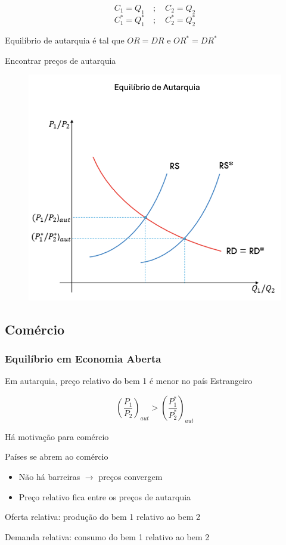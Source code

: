 \documentclass[a4paper,12pt]{article}[abntex2]
\begin{document}
\[
C_1 = Q_1 \quad ; \quad C_2 = Q_2
\]
\[
C_1^* = Q_1^* \quad ; \quad C_2^* = Q_2^*
\]

Equilíbrio de autarquia é tal que \( OR = DR \) e \( OR^* = DR^* \)

Encontrar preços de autarquia

\begin{figure}[H]
    \centering
    \includegraphics[width=0.7\linewidth]{Imagens/a12i10.png}
\end{figure}

\subsection{\textbf{Comércio}}
\subsubsection{\textbf{Equilíbrio em Economia Aberta}}

Em autarquia, preço relativo do bem 1 é menor no país Estrangeiro

\[
\left( \frac{P_1}{P_2} \right)_{aut} > \left( \frac{P_1^*}{P_2^*} \right)_{aut}
\]

Há motivação para comércio

Países se abrem ao comércio
\begin{itemize}
    \item Não há barreiras \( \rightarrow \) preços convergem
    \item Preço relativo fica entre os preços de autarquia
\end{itemize}

Oferta relativa: produção do bem 1 relativo ao bem 2

Demanda relativa: consumo do bem 1 relativo ao bem 2
\end{document}
